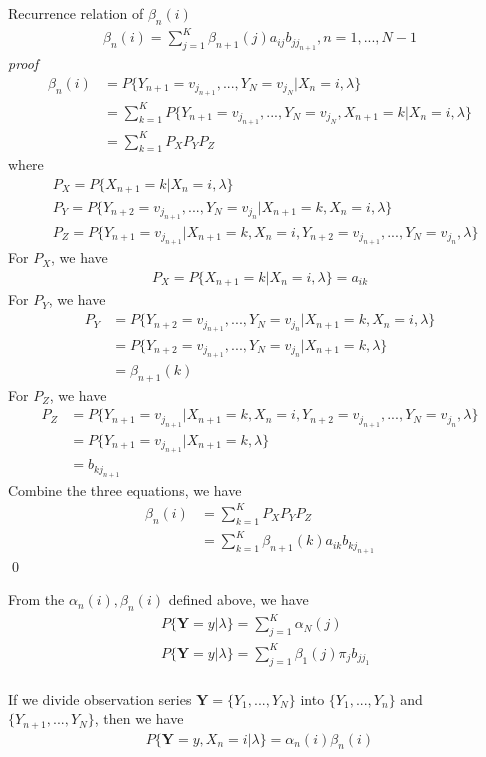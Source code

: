 \documentclass[runningheads]{llncs}
\begin{document}
\par
Recurrence relation of $\beta_n(i)$
\begin{align}
    \beta_n(i) = \sum_{j=1}^K \beta_{n+1}(j) a_{ij} b_{jj_{n+1}}, n = 1,...,N - 1
\end{align}
\emph{proof}
\begin{align}
    \beta_{n}(i) &= P \{ Y_{n+1} = v_{j_{n+1}},...,Y_N = v_{j_N} | X_n = i, \lambda \} \\
    &= \sum_{k=1}^K P \{ Y_{n+1} = v_{j_{n+1}},...,Y_N = v_{j_N}, X_{n+1} = k | X_n = i, \lambda \} \\
    &= \sum_{k=1}^K P_X P_Y P_Z
\end{align}
where
\begin{align}
    &P_X = P \{ X_{n+1} = k | X_n = i, \lambda \} \\
    &P_Y = P \{ Y_{n+2} = v_{j_{n+1}},..., Y_N = v_{j_n} | X_{n+1} = k, X_n = i, \lambda \} \\
    &P_Z = P \{ Y_{n+1} = v_{j_{n+1}} | X_{n+1} = k, X_n = i, Y_{n+2} = v_{j_{n+1}},..., Y_N = v_{j_n}, \lambda \}
\end{align}
For $P_X$, we have
\begin{align}
    P_X = P \{ X_{n+1} = k | X_n = i, \lambda \} = a_{ik}
\end{align}
For $P_Y$, we have
\begin{align}
    P_Y &= P \{ Y_{n+2} = v_{j_{n+1}},..., Y_N = v_{j_n} | X_{n+1} = k, X_n = i, \lambda \} \\
    &= P \{ Y_{n+2} = v_{j_{n+1}},..., Y_N = v_{j_n} | X_{n+1} = k, \lambda \} \\
    &= \beta_{n+1}(k)
\end{align}
For $P_Z$, we have
\begin{align}
    P_Z &= P \{ Y_{n+1} = v_{j_{n+1}} | X_{n+1} = k, X_n = i, Y_{n+2} = v_{j_{n+1}},..., Y_N = v_{j_n}, \lambda \} \\
    &= P \{ Y_{n+1} = v_{j_{n+1}} | X_{n+1} = k, \lambda \} \\
    &= b_{kj_{n+1}}
\end{align}
Combine the three equations, we have
\begin{align}
    \beta_n(i) &= \sum_{k=1}^K P_X P_Y P_Z \\
    &= \sum_{k=1}^K \beta_{n+1}(k) a_{ik} b_{kj_{n+1}}
\end{align} \qed
\par
From the $\alpha_n(i), \beta_n(i)$ defined above, we have
\begin{align}
    &P \{ \mathbf{Y} = y | \lambda \} = \sum_{j=1}^K \alpha_N(j) \\
    &P \{ \mathbf{Y} = y | \lambda \} = \sum_{j=1}^K \beta_1(j) \pi_j b_{jj_1} \\
\end{align}

\par
If we divide observation series $\mathbf{Y} = \{ Y_1,..., Y_N \}$
into $\{ Y_1,..., Y_n \}$ and  $\{ Y_{n+1},..., Y_N \}$, then we have
\begin{align}
    P \{ \mathbf{Y} = y, X_n = i | \lambda \} = \alpha_n(i) \beta_n(i)
\end{align}
\end{document}
